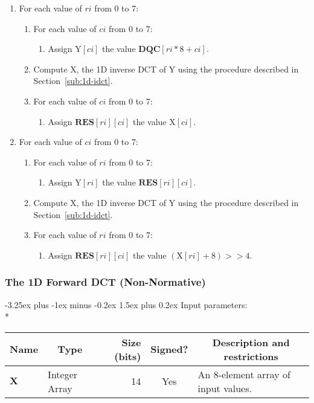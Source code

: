 \documentclass[9pt,letterpaper]{book}
\makeatletter
\newcommand{\idx}[1]{{\ensuremath{\mathit{#1}}}}
\newcommand{\ci}{\idx{ci}}
\newcommand{\ri}{\idx{ri}}
\newcommand{\bitvar}[1]{\ensuremath{\mathbf{\bm{#1}}}}
\newcommand{\locvar}[1]{\ensuremath{\mathrm{#1}}}
\numberwithin{equation}{chapter}
\numberwithin{figure}{chapter}
\numberwithin{table}{chapter}
\renewcommand{\paragraph}{\@startsection{paragraph}{4}{0ex}%
 {-3.25ex plus -1ex minus -0.2ex}%
 {1.5ex plus 0.2ex}%
 {\normalfont\normalsize\bfseries}}
\makeatother
\begin{document}
\begin{enumerate}
\item
For each value of \locvar{\ri} from 0 to 7:
\begin{enumerate}
\item
For each value of \locvar{\ci} from 0 to 7:
\begin{enumerate}
\item
Assign $\locvar{Y}[\locvar{\ci}]$ the value
 $\bitvar{DQC}[\locvar{\ri}*8+\locvar{\ci}]$.
\end{enumerate}
\item
Compute \locvar{X}, the 1D inverse DCT of \locvar{Y} using the procedure
 described in Section~\ref{sub:1d-idct}.
\item
For each value of $\locvar{\ci}$ from 0 to 7:
\begin{enumerate}
\item
Assign $\bitvar{RES}[\locvar{\ri}][\locvar{\ci}]$ the value
 $\locvar{X}[\locvar{\ci}]$.
\end{enumerate}
\end{enumerate}
\item
For each value of \locvar{\ci} from 0 to 7:
\begin{enumerate}
\item
For each value of \locvar{\ri} from 0 to 7:
\begin{enumerate}
\item
Assign $\locvar{Y}[\locvar{\ri}]$ the value
 $\bitvar{RES}[\locvar{\ri}][\locvar{\ci}]$.
\end{enumerate}
\item
Compute \locvar{X}, the 1D inverse DCT of \locvar{Y} using the procedure
 described in Section~\ref{sub:1d-idct}.
\item
For each value of \locvar{\ri} from 0 to 7:
\begin{enumerate}
\item
Assign $\bitvar{RES}[\locvar{\ri}][\locvar{\ci}]$ the value
 $(\locvar{X}[\locvar{\ri}]+8)>>4$.
\end{enumerate}
\end{enumerate}
\end{enumerate}

\subsubsection{The 1D Forward DCT (Non-Normative)}

\paragraph{Input parameters:}\hfill\\*
\begin{tabularx}{\textwidth}{@{}llrcX@{}}\toprule
\multicolumn{1}{c}{Name} &
\multicolumn{1}{c}{Type} &
\multicolumn{1}{p{30pt}}{\centering Size (bits)} &
\multicolumn{1}{c}{Signed?} &
\multicolumn{1}{c}{Description and restrictions} \\\midrule\endhead
\bitvar{X}        & \multicolumn{1}{p{40pt}}{Integer Array} &
                              14 & Yes & An 8-element array of input values. \\
\bottomrule\end{tabularx}
\end{document}
